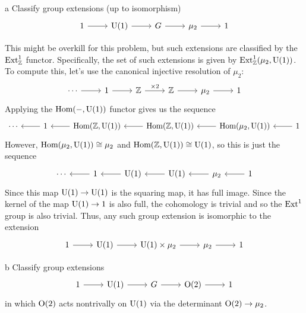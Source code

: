 \documentclass{pset}
\begin{document}
\begin{parts}
  \begin{part}{a}
  Classify group extensions (up to isomorphism)
  \[\begin{tikzcd}
	  1 & \U(1) & G & {\mu_2} & 1
	  \arrow[from=1-2, to=1-3]
	  \arrow[from=1-3, to=1-4]
	  \arrow[from=1-4, to=1-5]
	  \arrow[from=1-1, to=1-2]
  \end{tikzcd}\] 
  \end{part}

  This might be overkill for this problem, but such extensions are classified by the $\mathrm{Ext}^1_{\mathbb{Z}}$ functor. Specifically, the set of such extensions is given by $\mathrm{Ext}^1_{\mathbb{Z}}(\mu_2, \mathrm{U}(1))$. To compute this, let's use the canonical injective resolution of $\mu_2$:
  \[\begin{tikzcd}
	  \cdots&1 & \Z & \Z & \mu_2 & 1
	  \arrow[from=1-2, to=1-3]
	  \arrow["\times 2",from=1-3, to=1-4]
	  \arrow[from=1-4, to=1-5]
	  \arrow[from=1-1, to=1-2]
	  \arrow[from=1-5, to=1-6]
  \end{tikzcd}\] 
  Applying the $\textrm{Hom}(-, \mathrm{U}(1))$ functor gives us the sequence 
  \[\begin{tikzcd}
	  \cdots&1 & \Hom(\Z, \U(1)) & \Hom(\Z, \U(1)) & \Hom(\mu_2, \U(1)) & 1
	  \arrow[from=1-3, to=1-2]
	  \arrow[from=1-4, to=1-3]
	  \arrow[from=1-5, to=1-4]
	  \arrow[from=1-2, to=1-1]
	  \arrow[from=1-6, to=1-5]
  \end{tikzcd}\] 
  However, $\textrm{Hom}(\mu_2, \mathrm{U}(1))\cong \mu_2$ and $\textrm{Hom}(\mathbb{Z}, \mathrm{U}(1))\cong \mathrm{U}(1)$, so this is just the sequence
  \[\begin{tikzcd}
	  \cdots&1 & \U(1) & \U(1) & \mu_2 & 1
	  \arrow[from=1-3, to=1-2]
	  \arrow[from=1-4, to=1-3]
	  \arrow[from=1-5, to=1-4]
	  \arrow[from=1-2, to=1-1]
	  \arrow[from=1-6, to=1-5]
  \end{tikzcd}\] 
  Since this map $\mathrm{U}(1)\to \mathrm{U}(1)$ is the squaring map, it has full image. Since the kernel of the map $\mathrm{U}(1)\to 1$ is also full, the cohomology is trivial and so the $\mathrm{Ext}^1$ group is also trivial. Thus, any such group extension is isomorphic to the extension
  \[\begin{tikzcd}
	  1 & \U(1) & \U(1)\times \mu_2 & {\mu_2} & 1
	  \arrow[from=1-2, to=1-3]
	  \arrow[from=1-3, to=1-4]
	  \arrow[from=1-4, to=1-5]
	  \arrow[from=1-1, to=1-2]
  \end{tikzcd}\] 

  \begin{part}{b}
    Classify group extensions
    \[\begin{tikzcd}
	    1 & {\U(1)} & G & {\O(2)} & 1
	    \arrow[from=1-2, to=1-3]
	    \arrow[from=1-3, to=1-4]
	    \arrow[from=1-4, to=1-5]
	    \arrow[from=1-1, to=1-2]
    \end{tikzcd}\]
    in which $\mathrm{O}(2)$ acts nontrivally on $\mathrm{U}(1)$ via the determinant $\mathrm{O}(2) \to \mu_2$.
  \end{part}


\end{parts}
\end{document}
